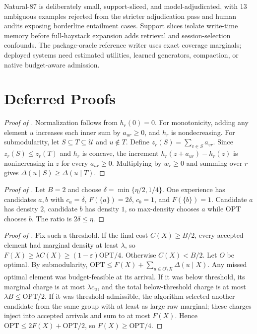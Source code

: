 \documentclass{article}
\theoremstyle{remark}
\theoremstyle{plain}
\newcommand{\budget}{B}
\newcommand{\ground}{\mathcal{U}}
\newcommand{\opt}{\mathrm{OPT}}
\begin{document}
Natural-87 is deliberately small, support-sliced, and model-adjudicated, with 13 ambiguous examples rejected from the stricter adjudication pass and human audits exposing borderline entailment cases. Support slices isolate write-time memory before full-haystack expansion adds retrieval and session-selection confounds. The package-oracle reference writer uses exact coverage marginals; deployed systems need estimated utilities, learned generators, compaction, or native budget-aware admission.

\clearpage



\clearpage
\appendix

\section{Deferred Proofs}\label{app:proofs}

\begin{proof}[Proof of ]
Normalization follows from $h_r(0)=0$. For monotonicity, adding any element $u$ increases each inner sum by $a_{ur}\geq0$, and $h_r$ is nondecreasing. For submodularity, let $S\subseteq T\subseteq\ground$ and $u\notin T$. Define $z_r(S)=\sum_{v\in S}a_{vr}$. Since $z_r(S)\leq z_r(T)$ and $h_r$ is concave, the increment $h_r(z+a_{ur})-h_r(z)$ is nonincreasing in $z$ for every $a_{ur}\geq0$. Multiplying by $w_r\geq0$ and summing over $r$ gives $\Delta(u\mid S)\geq\Delta(u\mid T)$.
\end{proof}

\begin{proof}[Proof of ]
Let $\budget=2$ and choose $\delta=\min\{\eta/2,1/4\}$. One experience has candidates $a,b$ with $c_a=\delta$, $F(\{a\})=2\delta$, $c_b=1$, and $F(\{b\})=1$. Candidate $a$ has density $2$, candidate $b$ has density $1$, so max-density chooses $a$ while OPT chooses $b$. The ratio is $2\delta\leq\eta$.
\end{proof}

\begin{proof}[Proof of ]
Fix such a threshold. If the final cost $C(X)\geq\budget/2$, every accepted element had marginal density at least $\lambda$, so $F(X)\geq\lambda C(X)\geq(1-\varepsilon)\opt/4$. Otherwise $C(X)<\budget/2$. Let $O$ be optimal. By submodularity, $\opt\leq F(X)+\sum_{u\in O\setminus X}\Delta(u\mid X)$. Any missed optimal element was budget-feasible at its arrival. If it was below threshold, its marginal charge is at most $\lambda c_u$, and the total below-threshold charge is at most $\lambda\budget\leq\opt/2$. If it was threshold-admissible, the algorithm selected another candidate from the same group with at least as large raw marginal; these charges inject into accepted arrivals and sum to at most $F(X)$. Hence $\opt\leq2F(X)+\opt/2$, so $F(X)\geq\opt/4$.
\end{proof}
\end{document}
